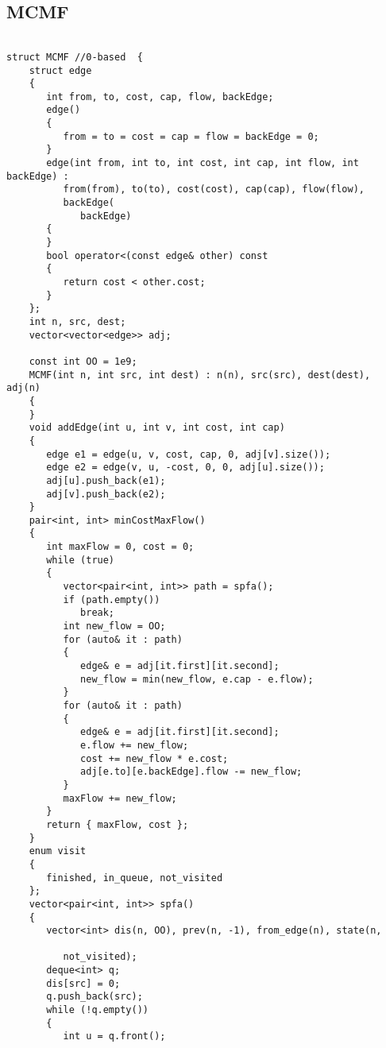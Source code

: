 \documentclass{article}
\begin{document}
\subsection{MCMF}
\begin{verbatim}
  
struct MCMF //0-based  {  
    struct edge  
    {  
       int from, to, cost, cap, flow, backEdge;  
       edge()  
       {  
          from = to = cost = cap = flow = backEdge = 0;  
       }  
       edge(int from, int to, int cost, int cap, int flow, int backEdge) :  
          from(from), to(to), cost(cost), cap(cap), flow(flow),  
          backEdge(  
             backEdge)  
       {  
       }  
       bool operator<(const edge& other) const  
       {  
          return cost < other.cost;  
       }  
    };  
    int n, src, dest;  
    vector<vector<edge>> adj;  
  
    const int OO = 1e9;  
    MCMF(int n, int src, int dest) : n(n), src(src), dest(dest), adj(n)  
    {  
    }  
    void addEdge(int u, int v, int cost, int cap)  
    {  
       edge e1 = edge(u, v, cost, cap, 0, adj[v].size());  
       edge e2 = edge(v, u, -cost, 0, 0, adj[u].size());  
       adj[u].push_back(e1);  
       adj[v].push_back(e2);  
    }  
    pair<int, int> minCostMaxFlow()  
    {  
       int maxFlow = 0, cost = 0;  
       while (true)  
       {  
          vector<pair<int, int>> path = spfa();  
          if (path.empty())  
             break;  
          int new_flow = OO;  
          for (auto& it : path)  
          {  
             edge& e = adj[it.first][it.second];  
             new_flow = min(new_flow, e.cap - e.flow);  
          }  
          for (auto& it : path)  
          {  
             edge& e = adj[it.first][it.second];  
             e.flow += new_flow;  
             cost += new_flow * e.cost;  
             adj[e.to][e.backEdge].flow -= new_flow;  
          }  
          maxFlow += new_flow;  
       }  
       return { maxFlow, cost };  
    }  
    enum visit  
    {  
       finished, in_queue, not_visited  
    };  
    vector<pair<int, int>> spfa()  
    {  
       vector<int> dis(n, OO), prev(n, -1), from_edge(n), state(n,  
  
          not_visited);  
       deque<int> q;  
       dis[src] = 0;  
       q.push_back(src);  
       while (!q.empty())  
       {  
          int u = q.front();  
  

\end{verbatim}
\end{document}
